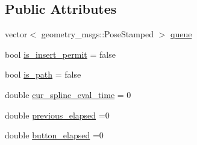 \subsection*{Public Attributes}
\begin{DoxyCompactItemize}
\item 
vector$<$ geometry\+\_\+msgs\+::\+Pose\+Stamped $>$ \hyperlink{class_target_manager_a0bbcb1981504e3bc587c3a98f41a91e9}{queue}
\item 
bool \hyperlink{class_target_manager_adf8a01c0942c3aac0445403d8f0f4cce}{is\+\_\+insert\+\_\+permit} = false
\item 
bool \hyperlink{class_target_manager_a507af7ce1ac562510c1b907553a2e596}{is\+\_\+path} = false
\item 
double \hyperlink{class_target_manager_a65817ac2f2ce483a7218e903bdfe5c67}{cur\+\_\+spline\+\_\+eval\+\_\+time} = 0
\item 
double \hyperlink{class_target_manager_a8260c1908c073454b41d350a5ce9e435}{previous\+\_\+elapsed} =0
\item 
double \hyperlink{class_target_manager_ac60d6fea0aeb2e64da49bf0a9713b0b2}{button\+\_\+elapsed} =0
\end{DoxyCompactItemize}
